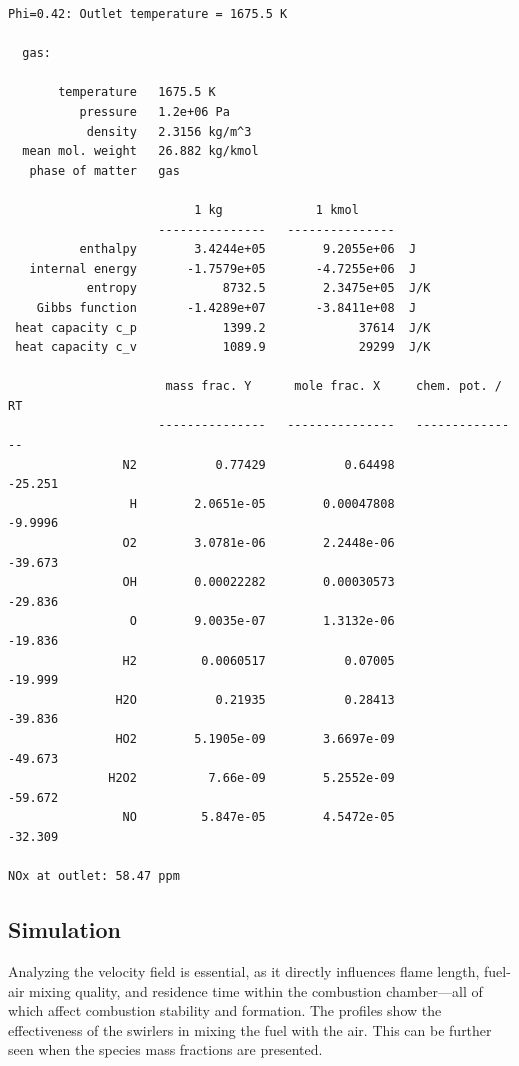 \begin{verbatim}
Phi=0.42: Outlet temperature = 1675.5 K

  gas:

       temperature   1675.5 K
          pressure   1.2e+06 Pa
           density   2.3156 kg/m^3
  mean mol. weight   26.882 kg/kmol
   phase of matter   gas

                          1 kg             1 kmol     
                     ---------------   ---------------
          enthalpy        3.4244e+05        9.2055e+06  J
   internal energy       -1.7579e+05       -4.7255e+06  J
           entropy            8732.5        2.3475e+05  J/K
    Gibbs function       -1.4289e+07       -3.8411e+08  J
 heat capacity c_p            1399.2             37614  J/K
 heat capacity c_v            1089.9             29299  J/K

                      mass frac. Y      mole frac. X     chem. pot. / RT
                     ---------------   ---------------   ---------------
                N2           0.77429           0.64498           -25.251
                 H        2.0651e-05        0.00047808           -9.9996
                O2        3.0781e-06        2.2448e-06           -39.673
                OH        0.00022282        0.00030573           -29.836
                 O        9.0035e-07        1.3132e-06           -19.836
                H2         0.0060517           0.07005           -19.999
               H2O           0.21935           0.28413           -39.836
               HO2        5.1905e-09        3.6697e-09           -49.673
              H2O2          7.66e-09        5.2552e-09           -59.672
                NO         5.847e-05        4.5472e-05           -32.309
                
NOx at outlet: 58.47 ppm
\end{verbatim}

\subsection{Simulation}

Analyzing the velocity field is essential, as it directly influences flame length, fuel-air mixing quality, and residence time within the combustion chamber—all of which affect combustion stability and  formation. The profiles show the effectiveness of the swirlers in mixing the fuel with the air. This can be further seen when the species mass fractions are presented.

